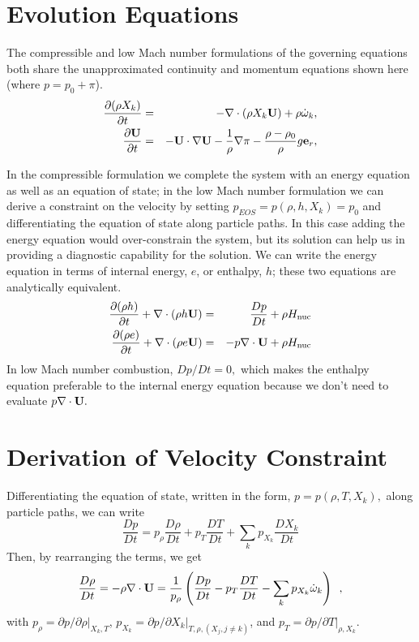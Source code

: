 \section{Evolution Equations}

The compressible and low Mach number formulations of the governing
equations both share the unapproximated continuity and momentum equations
shown here (where $p = p_0 + \pi$).
\begin{eqnarray}
\frac{\partial(\rho X_k)}{\partial t} &=& -\nabla\cdot(\rho X_k{\bf U}) + 
\rho\dot{\omega}_k,\label{eq:species}\\
\frac{\partial{\bf U}}{\partial t} &=& -{\bf U}\cdot\nabla{\bf U}  - 
  \frac{1}{\rho}\nabla\pi - 
  \frac{\rho-\rho_0}{\rho} g{\bf e}_r,\label{eq:momentum}
\end{eqnarray}

In the compressible formulation we complete the system with an energy
equation as well as an equation of state; in the low Mach number
formulation we can derive a constraint on the velocity by 
setting $p_{EOS} = p(\rho,h,X_k) = p_0$ and
differentiating the equation of state along particle paths.
In this case adding the energy equation would over-constrain the system, 
but its solution can help us in providing a diagnostic capability for the
solution.  We can write the energy equation in terms of internal energy, $e$,
or enthalpy, $h$; these two equations are analytically equivalent.
\begin{eqnarray}
\frac{\partial(\rho h)}{\partial t} + \nabla\cdot(\rho h\Ub) 
 &=& \frac{Dp}{Dt} + \rho\Hnuc \nonumber \\
%
\frac{\partial(\rho e)}{\partial t} + \nabla\cdot(\rho e \Ub)
 &=& - p\nabla\cdot \Ub + \rho\Hnuc \nonumber 
\end{eqnarray}
In low Mach number combustion, $Dp/Dt = 0,$ which makes the enthalpy equation
preferable to the internal energy equation because we don't need to
evaluate $p \nabla \cdot {\bf U}.$ 

\section{Derivation of Velocity Constraint}

Differentiating the equation of state, written in the form, $p =
p(\rho,T,X_k),$ along particle paths, we can write
\begin{equation}
\frac{D p}{Dt}  = p_\rho \frac{D \rho}{Dt} + p_T \frac{D T}{Dt} + \sum_k p_{X_k} \frac{D X_k}{Dt}
\end{equation}
Then, by rearranging the terms, we get
\begin{equation}
\frac{D \rho}{Dt}  = -\rho \nabla \cdot {\bf U} = 
    \frac{1}{p_\rho}
    \left( \frac{D p}{Dt} - p_T \frac{D T}{Dt}
                          - \sum_k p_{X_k} {\dot{\omega}}_k \right) \enskip ,
\end{equation}
with $p_\rho = \left.\partial p/\partial \rho\right|_{X_k,T}$,
$p_{X_k} = \left.\partial p/\partial X_k \right|_{T,\rho,(X_j,j\ne k)}$,
and $p_T = \left.\partial p/\partial T\right|_{\rho,X_k}$.

